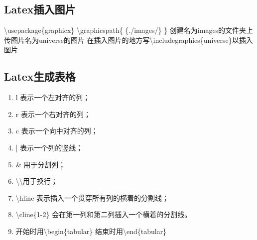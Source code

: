 \documentclass{article}
\begin{document}
\subsection{Latex插入图片}
\textbackslash{usepackage\{graphicx\}}\newline
\textbackslash{graphicspath\{ \{./images/\} \}}\newline
创建名为images的文件夹上传图片名为universe的图片\newline
在插入图片的地方写\textbackslash{includegraphics\{universe\}}以插入图片
\subsection{Latex生成表格}
\begin{enumerate}
\item l 表示一个左对齐的列；\newline
\item r 表示一个右对齐的列；\newline
\item c 表示一个向中对齐的列；\newline
\item | 表示一个列的竖线；\newline
\item \& 用于分割列；\newline
\item \textbackslash\textbackslash 用于换行；\newline
\item \textbackslash{hline} 表示插入一个贯穿所有列的横着的分割线；\newline
\item \textbackslash{cline\{1-2\}} 会在第一列和第二列插入一个横着的分割线。\newline
\item 开始时用\textbackslash{begin\{tabular\}}\newline
 结束时用\textbackslash{end\{tabular\}}
\end{enumerate}
\end{document}
